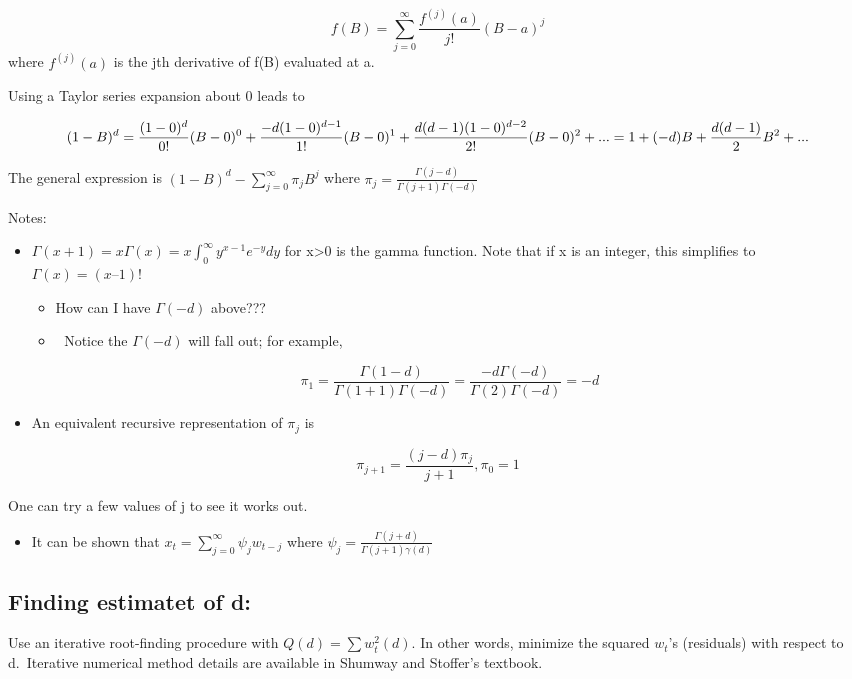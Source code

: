 \documentclass[
]{book}
\providecommand{\tightlist}{%
  \setlength{\itemsep}{0pt}\setlength{\parskip}{0pt}}
\theoremstyle{definition}
\theoremstyle{definition}
\theoremstyle{definition}
\theoremstyle{definition}
\theoremstyle{remark}
\begin{document}
\[f(B)=\sum_{j=0}^{\infty}\frac{f^{(j)}(a)}{j!}(B-a)^j\] where \(f^{(j)}(a)\) is the jth derivative of f(B) evaluated at a.

Using a Taylor series expansion about 0 leads to

\[(1-B)^d=\frac{(1-0)^d}{0!}(B-0)^0+\frac{-d(1-0)^{d-1}}{1!}(B-0)^1\\+\frac{d(d-1)(1-0)^{d-2}}{2!}(B-0)^2+...\\
=1+(-d)B+\frac{d(d-1)}{2}B^2+...\]

The general expression is \((1-B)^d-\sum_{j=0}^{\infty}\pi_jB^j\) where \(\pi_j=\frac{\Gamma(j-d)}{\Gamma(j+1)\Gamma(-d)}\)

Notes:

\begin{itemize}
\item
  \(\Gamma(x+1)=x\Gamma(x)=x\int_{0}^{\infty}y^{x-1}e^{-y}dy\) for x\textgreater0 is the gamma function. Note that if x is an integer, this simplifies to \(\Gamma(x) = (x – 1)!\)

  \begin{itemize}
  \tightlist
  \item
    How can I have \(\Gamma(-d)\) above???
  \item
     Notice the \(\Gamma(-d)\) will fall out; for example,
  \end{itemize}

  \[\pi_1=\frac{\Gamma(1-d)}{\Gamma(1+1)\Gamma(-d)}=\frac{-d\Gamma(-d)}{\Gamma(2)\Gamma(-d)}=-d\]
\item
  An equivalent recursive representation of \(\pi_j\) is
\end{itemize}

\[\pi_{j+1}=\frac{(j-d)\pi_j}{j+1}, \pi_0=1\]

One can try a few values of j to see it works out.

\begin{itemize}
\tightlist
\item
  It can be shown that \(x_t=\sum_{j=0}^{\infty}\psi_jw_{t-j}\) where \(\psi_j=\frac{\Gamma(j+d)}{\Gamma(j+1)\gamma(d)}\)
\end{itemize}

\hypertarget{finding-estimatet-of-d}{%
\subsection{Finding estimatet of d:}\label{finding-estimatet-of-d}}

Use an iterative root-finding procedure with \(Q(d) = \sum w_t^2(d)\). In other words, minimize the squared \(w_t\)'s (residuals) with respect to d.~Iterative numerical method details are available in Shumway and Stoffer's textbook.
\end{document}
